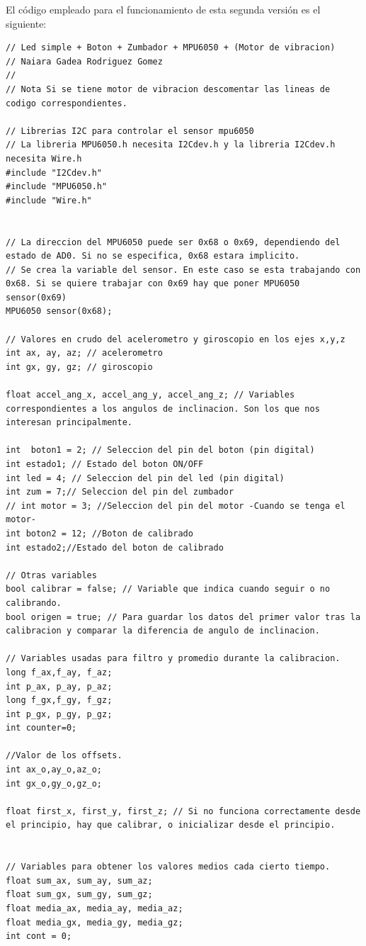 \clearpage
El código empleado para el funcionamiento de esta segunda versión es el siguiente:
\begin{lstlisting}
// Led simple + Boton + Zumbador + MPU6050 + (Motor de vibracion)
// Naiara Gadea Rodriguez Gomez
// 
// Nota Si se tiene motor de vibracion descomentar las lineas de codigo correspondientes.

// Librerias I2C para controlar el sensor mpu6050 
// La libreria MPU6050.h necesita I2Cdev.h y la libreria I2Cdev.h necesita Wire.h 
#include "I2Cdev.h" 
#include "MPU6050.h" 
#include "Wire.h" 


// La direccion del MPU6050 puede ser 0x68 o 0x69, dependiendo del estado de AD0. Si no se especifica, 0x68 estara implicito.
// Se crea la variable del sensor. En este caso se esta trabajando con 0x68. Si se quiere trabajar con 0x69 hay que poner MPU6050 sensor(0x69) 
MPU6050 sensor(0x68); 

// Valores en crudo del acelerometro y giroscopio en los ejes x,y,z 
int ax, ay, az; // acelerometro 
int gx, gy, gz; // giroscopio 

float accel_ang_x, accel_ang_y, accel_ang_z; // Variables correspondientes a los angulos de inclinacion. Son los que nos interesan principalmente.

int  boton1 = 2; // Seleccion del pin del boton (pin digital)
int estado1; // Estado del boton ON/OFF
int led = 4; // Seleccion del pin del led (pin digital)
int zum = 7;// Seleccion del pin del zumbador
// int motor = 3; //Seleccion del pin del motor -Cuando se tenga el motor-
int boton2 = 12; //Boton de calibrado
int estado2;//Estado del boton de calibrado

// Otras variables
bool calibrar = false; // Variable que indica cuando seguir o no calibrando.
bool origen = true; // Para guardar los datos del primer valor tras la calibracion y comparar la diferencia de angulo de inclinacion.

// Variables usadas para filtro y promedio durante la calibracion. 
long f_ax,f_ay, f_az; 
int p_ax, p_ay, p_az; 
long f_gx,f_gy, f_gz; 
int p_gx, p_gy, p_gz; 
int counter=0;

//Valor de los offsets.
int ax_o,ay_o,az_o; 
int gx_o,gy_o,gz_o; 

float first_x, first_y, first_z; // Si no funciona correctamente desde el principio, hay que calibrar, o inicializar desde el principio.


// Variables para obtener los valores medios cada cierto tiempo.
float sum_ax, sum_ay, sum_az;
float sum_gx, sum_gy, sum_gz;
float media_ax, media_ay, media_az;
float media_gx, media_gy, media_gz;
int cont = 0;


\end{lstlisting}
